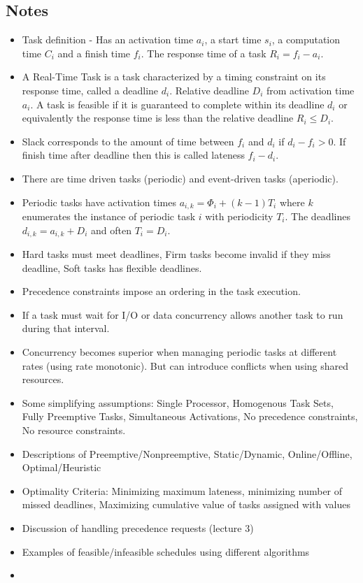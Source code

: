 \documentclass{article}
\begin{document}
\subsection{Notes}
\begin{itemize}
    \item Task definition - Has an activation time $a_i$, a start time $s_i$, a computation time $C_i$ and a finish time $f_i$.  The response time of a task $R_i=f_i-a_i$.
    \item A Real-Time Task is a task characterized by a timing constraint on its response time, called a deadline $d_i$. Relative deadline $D_i$ from activation time $a_i$. A task is feasible if it is guaranteed to complete within its deadline $d_i$ or equivalently the response time is less than the relative deadline $R_i \leq D_i$.
    \item Slack corresponds to the amount of time between $f_i$ and $d_i$ if $d_i - f_i > 0$.  If finish time after deadline then this is called lateness $f_i - d_i$.
    \item There are time driven tasks (periodic) and event-driven tasks (aperiodic).
    \item Periodic tasks have activation times $a_{i,k} = \Phi_i + (k-1)T_i$ where $k$ enumerates the instance of periodic task $i$ with periodicity $T_i$.  The deadlines $d_{i,k}=a_{i,k} + D_i$ and often $T_i=D_i$.
    \item Hard tasks must meet deadlines, Firm tasks become invalid if they miss deadline, Soft tasks has flexible deadlines.
    \item Precedence constraints impose an ordering in the task execution.
    \item If a task must wait for I/O or data concurrency allows another task to run during that interval.
    \item Concurrency becomes superior when managing periodic tasks at different rates (using rate monotonic). But can introduce conflicts when using shared resources.
    \item Some simplifying assumptions: Single Processor, Homogenous Task Sets, Fully Preemptive Tasks, Simultaneous Activations, No precedence constraints, No resource constraints.
    \item Descriptions of Preemptive/Nonpreemptive, Static/Dynamic, Online/Offline, Optimal/Heuristic
    \item Optimality Criteria: Minimizing maximum lateness, minimizing number of missed deadlines, Maximizing cumulative value of tasks assigned with values
    \item Discussion of handling precedence requests (lecture 3)
    \item Examples of feasible/infeasible schedules using different algorithms
    \item
\end{itemize}
\end{document}
